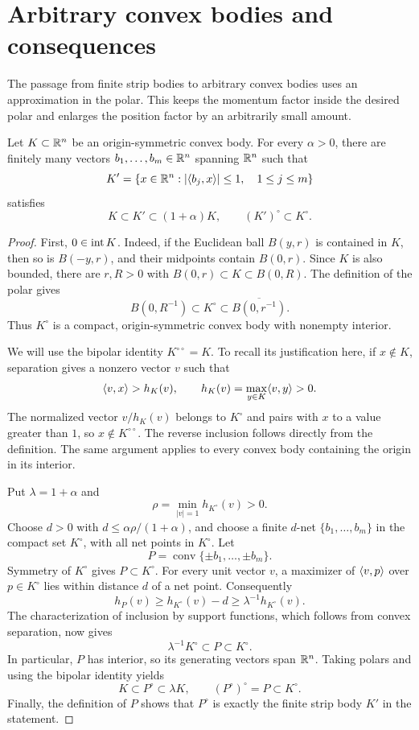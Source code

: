 \section{Arbitrary convex bodies and consequences}
\label{sec:approximation}

The passage from finite strip bodies to arbitrary convex bodies uses an
approximation in the polar. This keeps the momentum factor inside the
desired polar and enlarges the position factor by an arbitrarily small
amount.

\begin{lemma}
\label{lem:polar-approximation}
Let $K\subset\mathbb R^n$ be an origin-symmetric convex body. For every
$\alpha>0$, there are finitely many vectors
$b_1,\ldots,b_m\in\mathbb R^n$ spanning $\mathbb R^n$ such that
\[
 K'=\{x\in\mathbb R^n:|\langle b_j,x\rangle|\le1,\quad 1\le j\le m\}
\]
satisfies
\begin{equation}\label{eq:polar-approximation}
 K\subset K'\subset(1+\alpha)K,
 \qquad (K')^\circ\subset K^\circ.
\end{equation}
\end{lemma}

\begin{proof}
First, $0\in\operatorname{int} K$. Indeed, if the Euclidean ball $B(y,r)$
is contained in $K$, then so is $B(-y,r)$, and their midpoints contain
$B(0,r)$. Since $K$ is also bounded, there are $r,R>0$ with
$B(0,r)\subset K\subset B(0,R)$. The definition of the polar gives
\[
 B(0,R^{-1})\subset K^\circ\subset\overline{B(0,r^{-1})}.
\]
Thus $K^\circ$ is a compact, origin-symmetric convex body with nonempty
interior.

We will use the bipolar identity $K^{\circ\circ}=K$. To recall its
justification here, if $x\notin K$, separation gives a nonzero vector
$v$ such that
\[
 \langle v,x\rangle>h_K(v),
 \qquad h_K(v)=\max_{y\in K}\langle v,y\rangle>0.
\]
The normalized vector $v/h_K(v)$ belongs to $K^\circ$ and pairs with
$x$ to a value greater than $1$, so $x\notin K^{\circ\circ}$.
The reverse inclusion follows directly from the definition. The same
argument applies to every convex body containing the origin in its
interior.

Put $\lambda=1+\alpha$ and
\[
 \rho=\min_{|v|=1}h_{K^\circ}(v)>0.
\]
Choose $d>0$ with $d\le\alpha\rho/(1+\alpha)$, and choose a finite
$d$-net $\{b_1,\ldots,b_m\}$ in the compact set $K^\circ$, with all
net points in $K^\circ$. Let
\[
 P=\operatorname{conv}\{\pm b_1,\ldots,\pm b_m\}.
\]
Symmetry of $K^\circ$ gives $P\subset K^\circ$. For every unit vector
$v$, a maximizer of $\langle v,p\rangle$ over $p\in K^\circ$ lies within
distance $d$ of a net point. Consequently
\[
 h_P(v)\ge h_{K^\circ}(v)-d
       \ge\lambda^{-1}h_{K^\circ}(v).
\]
The characterization of inclusion by support functions, which follows
from convex separation, now gives
\[
 \lambda^{-1}K^\circ\subset P\subset K^\circ.
\]
In particular, $P$ has interior, so its generating vectors span
$\mathbb R^n$. Taking polars and using the bipolar identity yields
\[
 K\subset P^\circ\subset\lambda K,
 \qquad (P^\circ)^\circ=P\subset K^\circ.
\]
Finally, the definition of $P$ shows that $P^\circ$ is exactly the
finite strip body $K'$ in the statement.
\end{proof}

